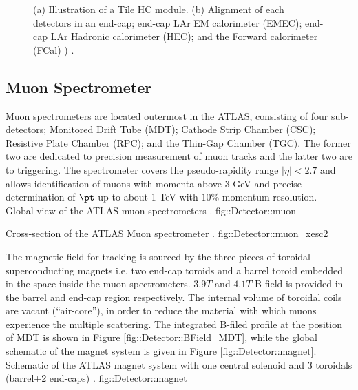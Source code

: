 \begin{figure}
  \centering
    \caption{ (a) Illustration of a Tile HC module. (b)  Alignment of each detectors in an end-cap; end-cap LAr EM calorimeter (EMEC); end-cap LAr Hadronic calorimeter (HEC); and the Forward calorimeter (FCal)   ) \cite{ATLAS_exp}.
      \label{fig::Detector::caloCell} }
\end{figure}




\clearpage
\subsection{Muon Spectrometer}
Muon spectrometers are located outermost in the ATLAS, consisting of four sub-detectors; Monitored Drift Tube (MDT); Cathode Strip Chamber (CSC); Resistive Plate Chamber (RPC); and the Thin-Gap Chamber (TGC). 
The former two are dedicated to precision measurement of muon tracks and the latter two are to triggering. 
The spectrometer covers the pseudo-rapidity range $ |\eta|< 2.7$ and allows identification of muons with momenta above 3 GeV and precise determination of $\pt$ up to about 1 TeV with $10\%$ momentum resolution.  \\

{Global view of the ATLAS muon spectrometers \cite{ATLAS_exp}.}
{fig::Detector::muon}


{Cross-section of the ATLAS Muon spectrometer \cite{ATLAScosmicPerf}.}
{fig::Detector::muon_xesc2}

\clearpage
The magnetic field for tracking is sourced by the three pieces of toroidal superconducting magnets i.e. two end-cap toroids and a barrel toroid embedded in the space inside the muon spectrometers. $3.9T$ and $4.1T$ B-field is provided in the barrel and end-cap region respectively. The internal volume of toroidal coils are vacant (``air-core''), in order to reduce the material with which muons experience the multiple scattering. The integrated B-filed profile at the position of MDT is shown in Figure \ref{fig::Detector::BField_MDT}, while the global schematic of the magnet system is given in Figure \ref{fig::Detector::magnet}. \\

{Schematic of the ATLAS magnet system with one central solenoid and 3 toroidals (barrel+2 end-caps) \cite{ATLAS_exp}.}
{fig::Detector::magnet}

